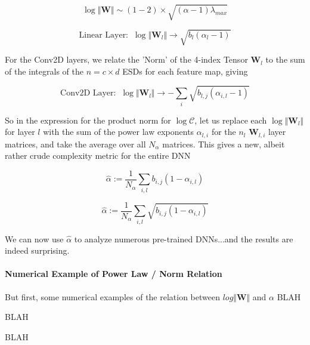 $$\log\Vert\mathbf{W}\Vert\sim(1-2)\times\sqrt{(\alpha-1)\lambda_{max}}$$



$$\text{Linear Layer:}\;\;\log\Vert\mathbf{W}_{l}\Vert\rightarrow\sqrt{b_{l}(\alpha_{l}-1)}$$

For the Conv2D layers, we relate the 'Norm' of the 4-index Tensor $\mathbf{W}_{l}$ to the sum of the integrals of the $n=c\times d$ ESDs for each feature map, giving 

$$\text{Conv2D Layer:}\;\;\log\Vert\mathbf{W}_{l}\Vert\rightarrow-\sum_{i}\sqrt{b_{l,j}(\alpha_{i,l}-1)}$$

So in the expression for the product norm for $\log\mathcal{C}$, let us replace each $\log\Vert\mathbf{W}_{l}\Vert$ for layer $l$ with the sum of the power law exponents $\alpha_{l,i}$ for the $n{_l}$ $\mathbf{W}_{l,i}$ layer matrices, and take the average over all $N_{\alpha}$  matrices.  This gives a new, albeit rather crude complexity metric for the entire DNN


$$\hat{\alpha}:=\dfrac{1}{N_{\alpha}}\sum_{i,l}b_{i,j}(1-\alpha_{i,l})$$


$$\hat{\alpha}:=\dfrac{1}{N_{\alpha}}\sum_{i,l}\sqrt{b_{i,j}(1-\alpha_{i,l})}$$


We can now use $\hat{\alpha}$ to analyze numerous pre-trained DNNs...and the results are indeed surprising.

\paragraph{Numerical Example of Power Law / Norm Relation}

But first, some numerical examples of the relation between $log\Vert\mathbf{W}\Vert$ and $\alpha$
BLAH

BLAH

BLAH


